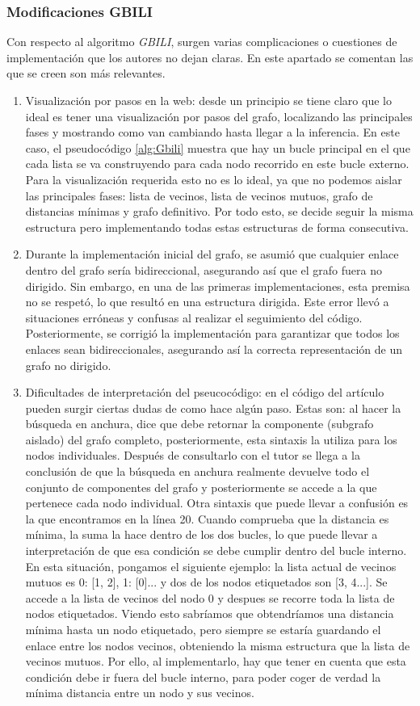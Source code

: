\subsubsection{Modificaciones GBILI}\label{sec5:gbili}
Con respecto al algoritmo \textit{GBILI}, surgen varias complicaciones o cuestiones de implementación que los autores no dejan claras. En este apartado se comentan las que se creen son más relevantes.
\begin{enumerate}
	\item Visualización por pasos en la web: desde un principio se tiene claro que lo ideal es tener una visualización por pasos del grafo, localizando las principales fases y mostrando como van cambiando hasta llegar a la inferencia. En este caso, el pseudocódigo \ref{alg:Gbili} muestra que hay un bucle principal en el que cada lista se va construyendo para cada nodo recorrido en este bucle externo. Para la visualización requerida esto no es lo ideal, ya que no podemos aislar las principales fases: lista de vecinos, lista de vecinos mutuos, grafo de distancias mínimas y grafo definitivo. Por todo esto, se decide seguir la misma estructura pero implementando todas estas estructuras de forma consecutiva.
	\item Durante la implementación inicial del grafo, se asumió que cualquier enlace dentro del grafo sería bidireccional, asegurando así que el grafo fuera no dirigido. Sin embargo, en una de las primeras implementaciones, esta premisa no se respetó, lo que resultó en una estructura dirigida. Este error llevó a situaciones erróneas y confusas al realizar el seguimiento del código. Posteriormente, se corrigió la implementación para garantizar que todos los enlaces sean bidireccionales, asegurando así la correcta representación de un grafo no dirigido.
	\item Dificultades de interpretación del pseucocódigo: en el código del artículo pueden surgir ciertas dudas de como hace algún paso. Estas son: al hacer la búsqueda en anchura, dice que debe retornar la componente (subgrafo aislado) del grafo completo, posteriormente, esta sintaxis la utiliza para los nodos individuales. Después de consultarlo con el tutor se llega a la conclusión de que la búsqueda en anchura realmente devuelve todo el conjunto de componentes del grafo y posteriormente se accede a la que pertenece cada nodo individual. Otra sintaxis que puede llevar a confusión es la que encontramos en la línea 20. Cuando comprueba que la distancia es mínima, la suma la hace dentro de los dos bucles, lo que puede llevar a interpretación de que esa condición se debe cumplir dentro del bucle interno. En esta situación, pongamos el siguiente ejemplo: la lista actual de vecinos mutuos es {0: [1, 2], 1: [0]...} y dos de los nodos etiquetados son [3, 4...]. Se accede a la lista de vecinos del nodo 0 y despues se recorre toda la lista de nodos etiquetados. Viendo esto sabríamos que obtendríamos una distancia mínima hasta un nodo etiquetado, pero siempre se estaría guardando el enlace entre los nodos vecinos, obteniendo la misma estructura que la lista de vecinos mutuos. Por ello, al implementarlo, hay que tener en cuenta que esta condición debe ir fuera del bucle interno, para poder coger de verdad la mínima distancia entre un nodo y sus vecinos.

\end{enumerate}
